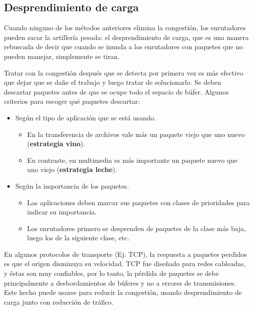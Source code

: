 \documentclass[10pt,a4paper]{report}
\begin{document}
\subsection{Desprendimiento de carga}

	\par Cuando ninguno de los métodos anteriores elimina la congestión, los enrutadores pueden sacar la artillería pesada: el desprendimiento de carga, que es una manera rebuscada de decir que cuando se inunda a los enrutadores con paquetes que no pueden manejar, simplemente se tiran.

	\par Tratar con la congestión después que se detecta por primera vez es más efectivo que dejar que se dañe el trabajo y luego tratar de solucionarlo. Se deben descartar paquetes antes de que se ocupe todo el espacio de búfer. Algunos criterios para escoger qué paquetes descartar:
	
	\begin{itemize}
		\item Según el tipo de aplicación que se está usando.
			\begin{itemize}
				\item En la transferencia de archivos vale más un paquete viejo que uno nuevo (\textbf{estrategia vino}).
				\item En contraste, en multimedia es más importante un paquete nuevo que uno viejo (\textbf{estrategia leche}).
			\end{itemize}
		\item Según la importancia de los paquetes.
			\begin{itemize}
				\item  Las aplicaciones deben marcar sus paquetes con clases de prioridades para indicar su importancia.
				\item Los enrutadores primero se desprenden de paquetes de la clase más baja,
luego los de la siguiente clase, etc.
			\end{itemize}			 
	\end{itemize}

	\par En algunos protocolos de transporte (Ej: TCP), la respuesta a paquetes perdidos es que el origen disminuya su velocidad. TCP fue diseñado para redes cableadas, y éstas son muy confiables, por lo tanto, la pérdida de paquetes se debe principalmente a desbordamientos de búferes y no a errores de transmisiones. Este hecho puede usarse para reducir la congestión, usando desprendimiento de carga junto con reducción de tráfico.
\end{document}
